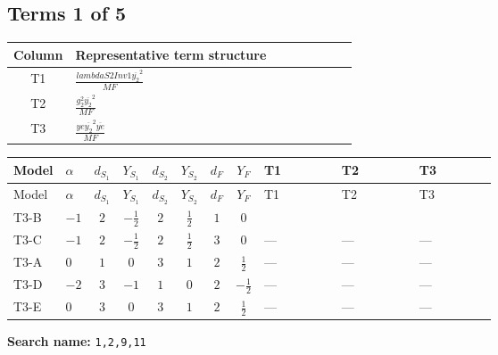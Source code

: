 \documentclass[8pt]{article}
\begin{document}
\begin{landscape}
\subsection*{Terms 1 of 5}
\begin{center}
\begin{tabular}{@{}c >{\raggedright\arraybackslash}p{0.82\linewidth}@{}}
\toprule
Column & Representative term structure \\
\midrule
T1 & \(\displaystyle \frac{lambdaS2Inv1 \overline{y_{2}}^{2}}{MF}\) \\
\midrule
T2 & \(\displaystyle \frac{g_{2}^{2} \overline{y_{2}}^{2}}{MF}\) \\
\midrule
T3 & \(\displaystyle \frac{ye \overline{y_{2}}^{2} \overline{ye}}{MF}\) \\
\midrule
\bottomrule
\end{tabular}
\end{center}
\smallskip
\tiny
\begin{longtable}{@{}llcccccc >{\raggedright\arraybackslash}p{0.21\linewidth} >{\raggedright\arraybackslash}p{0.21\linewidth} >{\raggedright\arraybackslash}p{0.21\linewidth}@{}}
\toprule
Model & $\alpha$ & $d_{S_1}$ & $Y_{S_1}$ & $d_{S_2}$ & $Y_{S_2}$ & $d_F$ & $Y_F$ & T1 & T2 & T3 \\
\midrule
\endfirsthead
\toprule
Model & $\alpha$ & $d_{S_1}$ & $Y_{S_1}$ & $d_{S_2}$ & $Y_{S_2}$ & $d_F$ & $Y_F$ & T1 & T2 & T3 \\
\midrule
\endhead
T3-B & $-1$ & $2$ & $-\frac{1}{2}$ & $2$ & $\frac{1}{2}$ & $1$ & $0$ & \scriptsize\adjustbox{max width=\linewidth}{$\begin{gathered} \frac{lambdaS2Inv1 \overline{y_{2}}^{2}}{4 MF}\end{gathered}$} & \scriptsize\adjustbox{max width=\linewidth}{$\begin{gathered} \frac{3 g_{2}^{2} \overline{y_{2}}^{2}}{8 MF}\end{gathered}$} & \scriptsize\adjustbox{max width=\linewidth}{$\begin{gathered} - \frac{ye \overline{y_{2}}^{2} \overline{ye}}{8 MF}\end{gathered}$} \\
\midrule
T3-C & $-1$ & $2$ & $-\frac{1}{2}$ & $2$ & $\frac{1}{2}$ & $3$ & $0$ & --- & --- & --- \\
\midrule
T3-A & $0$ & $1$ & $0$ & $3$ & $1$ & $2$ & $\frac{1}{2}$ & --- & --- & --- \\
\midrule
T3-D & $-2$ & $3$ & $-1$ & $1$ & $0$ & $2$ & $-\frac{1}{2}$ & --- & --- & --- \\
\midrule
T3-E & $0$ & $3$ & $0$ & $3$ & $1$ & $2$ & $\frac{1}{2}$ & --- & --- & --- \\
\midrule
\bottomrule
\end{longtable}
\clearpage
\noindent\textbf{Search name: }\texttt{1,2,9,11}\par\smallskip

\end{landscape}
\end{document}
